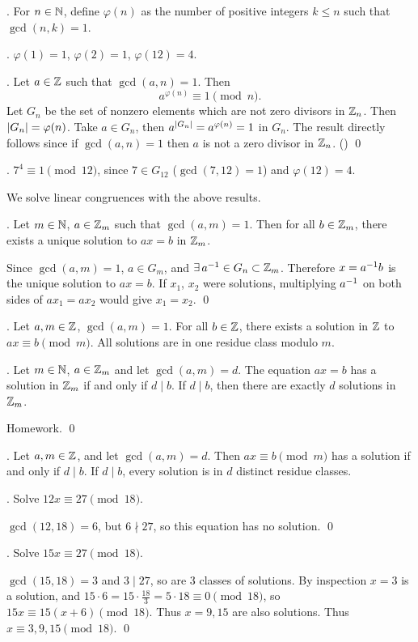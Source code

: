 .  For \(n \in \mathbb{N}\), define \(\varphi(n)\) as the number of positive integers \(k \leq n\) such that \(\gcd(n, k) = 1\).

\ex. \(\varphi(1) = 1\), \(\varphi(2) = 1\), \(\varphi(12) = 4\).

\thm.  Let \(a \in \mathbb{Z}\) such that \(\gcd(a, n) = 1\). Then
\[
    a^{\varphi(n)} \equiv 1 \pmod n.
\]
\pf Let \(G_n\) be the set of nonzero elements which are not zero divisors in \(\mathbb{Z}_n\). Then \(\left| G_n \right| = \varphi(n)\). Take \(a \in G_n\), then \(a^{\left| G_n \right|} = a^{\varphi(n)} = 1\) in \(G_n\). The result directly follows since if \(\gcd(a, n) = 1\) then \(a\) is not a zero divisor in \(\mathbb{Z}_n\). () \qed

\ex. \(7^4 \equiv 1 \pmod{12}\), since \(7 \in G_{12}\) (\(\gcd(7, 12) = 1\)) and \(\varphi(12) = 4\).

We solve linear congruences with the above results.

\thm. Let \(m \in \mathbb{N}\), \(a \in \mathbb{Z}_m\) such that \(\gcd(a, m) = 1\). Then for all \(b \in \mathbb{Z}_m\), there exists a unique solution to \(ax = b\) in \(\mathbb{Z}_m\).

\pf Since \(\gcd(a, m) = 1\), \(a \in G_m\), and \(\exists a\inv \in G_n \subset \Z_m\). Therefore \(x = a^{-1} b\) is the unique solution to \(ax = b\). If \(x_1\), \(x_2\) were solutions, multiplying \(a^{-1}\) on both sides of \(ax_1 = ax_2\) would give \(x_1 = x_2\). \qed

\cor. Let \(a, m \in \mathbb{Z}\), \(\gcd(a, m) = 1\). For all \(b \in \mathbb{Z}\), there exists a solution in \(\mathbb{Z}\) to \(ax \equiv b \pmod m\). All solutions are in one residue class modulo \(m\).

\thm. Let \(m \in \mathbb{N}\), \(a \in \mathbb{Z}_m\) and let \(\gcd(a, m) = d\). The equation \(ax = b\) has a solution in \(\mathbb{Z}_m\) if and only if \(d \mid b\). If \(d \mid b\), then there are exactly \(d\) solutions in \(\mathbb{Z}_m\).

\pf Homework. \qed

\cor. Let \(a, m \in \mathbb{Z}\), and let \(\gcd(a, m) = d\). Then \(ax \equiv b \pmod m\) has a solution if and only if \(d \mid b\). If \(d \mid b\), every solution is in \(d\) distinct residue classes.

\ex. Solve \(12x \equiv 27 \pmod{18}\).

\pf \(\gcd(12, 18) = 6\), but \(6 \nmid 27\), so this equation has no solution. \qed

\ex. Solve \(15x \equiv 27 \pmod{18}\).

\pf \(\gcd(15, 18) = 3\) and \(3 \mid 27\), so are 3 classes of solutions. By inspection \(x = 3\) is a solution, and \(15 \cdot 6 = 15 \cdot \frac{18}{3} = 5 \cdot 18 \equiv 0 \pmod{18}\), so \(15x \equiv 15(x+6) \pmod{18}\). Thus \(x = 9, 15\) are also solutions. Thus \(x \equiv 3, 9, 15 \pmod{18}\). \qed

\smallskip
